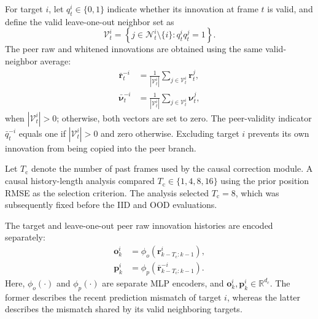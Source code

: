 \documentclass[10pt,doublecolumn]{IEEEtaes}
\begin{document}
For target $i$, let $q_t^i\in\{0,1\}$ indicate whether its innovation at frame $t$ is valid, and define the valid leave-one-out neighbor set as
\begin{equation}
\mathcal{V}_t^i=\left\{j\in\mathcal{N}_t^i\setminus\{i\}:q_t^i q_t^j=1\right\}.
\label{eq:valid_peer_set}
\end{equation}
The peer raw and whitened innovations are obtained using the same valid-neighbor average:
\begin{equation}
\begin{aligned}
\bar{\mathbf{r}}_t^{-i}&=
\frac{1}{|\mathcal{V}_t^i|}\sum_{j\in\mathcal{V}_t^i}\mathbf{r}_t^j,\\
\bar{\boldsymbol{\nu}}_t^{-i}&=
\frac{1}{|\mathcal{V}_t^i|}\sum_{j\in\mathcal{V}_t^i}\boldsymbol{\nu}_t^j,
\end{aligned}
\label{eq:peer_innovation}
\end{equation}
when $|\mathcal{V}_t^i|>0$; otherwise, both vectors are set to zero. The peer-validity indicator $\bar q_t^{-i}$ equals one if $|\mathcal{V}_t^i|>0$ and zero otherwise. Excluding target $i$ prevents its own innovation from being copied into the peer branch.

Let $T_{\mathrm{c}}$ denote the number of past frames used by the causal correction module. A causal history-length analysis compared $T_{\mathrm{c}}\in\{1,4,8,16\}$ using the prior position RMSE as the selection criterion. The analysis selected $T_{\mathrm{c}}=8$, which was subsequently fixed before the IID and OOD evaluations.

The target and leave-one-out peer raw innovation histories are encoded separately:
\begin{align}
\mathbf{o}_{k}^{i}
&=\phi_o\!\left(\mathbf{r}_{k-T_{\mathrm{c}}:k-1}^{i}\right),\\
\mathbf{p}_{k}^{i}
&=\phi_p\!\left(\bar{\mathbf{r}}_{k-T_{\mathrm{c}}:k-1}^{-i}\right).
\end{align}
Here, $\phi_o(\cdot)$ and $\phi_p(\cdot)$ are separate MLP encoders, and $\mathbf{o}_k^i,\mathbf{p}_k^i\in\mathbb{R}^{d_c}$. The former describes the recent prediction mismatch of target $i$, whereas the latter describes the mismatch shared by its valid neighboring targets.
\end{document}
